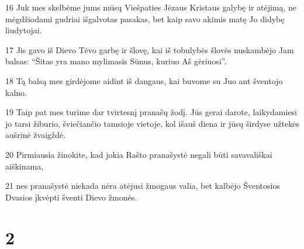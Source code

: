 \par 16 Juk mes skelbėme jums mūsų Viešpaties Jėzaus Kristaus galybę ir atėjimą, ne mėgdžiodami gudriai išgalvotas pasakas, bet kaip savo akimis matę Jo didybę liudytojai. 
\par 17 Jis gavo iš Dievo Tėvo garbę ir šlovę, kai iš tobulybės šlovės nuskambėjo Jam balsas: “Šitas yra mano mylimasis Sūnus, kuriuo Aš gėriuosi”. 
\par 18 Tą balsą mes girdėjome aidint iš dangaus, kai buvome su Juo ant šventojo kalno. 
\par 19 Taip pat mes turime dar tvirtesnį pranašų žodį. Jūs gerai darote, laikydamiesi jo tarsi žiburio, šviečiančio tamsioje vietoje, kol išauš diena ir jūsų širdyse užtekės aušrinė žvaigždė. 
\par 20 Pirmiausia žinokite, kad jokia Rašto pranašystė negali būti savavališkai aiškinama, 
\par 21 nes pranašystė niekada nėra atėjusi žmogaus valia, bet kalbėjo Šventosios Dvasios įkvėpti šventi Dievo žmonės.


\chapter{2}


